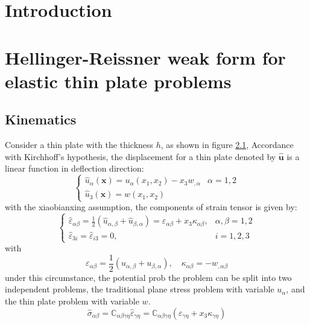 \documentclass{article}
\begin{document}
\section{Introduction}

\section{Hellinger-Reissner weak form for elastic thin plate problems}

\subsection{Kinematics}

Consider a thin plate with the thickness $h$, as shown in figure \ref{}, 
Accordance with Kirchhoff's hypothesis, the displacement for a thin plate denoted by $\hat {\boldsymbol u}$ is a linear function in deflection direction:
\begin{equation}
    \begin{cases}
        \hat u_{\alpha}(\boldsymbol x) = u_{\alpha}(x_1,x_2) - x_3 w_{,\alpha} & \alpha = 1,2 \\
        \hat u_{3}(\boldsymbol x) = w(x_1,x_2)
    \end{cases}
\end{equation}
with the xiaobianxing assumption, the components of strain tensor is given by:
\begin{equation}
    \begin{cases}
        \hat \varepsilon_{\alpha \beta} = \frac{1}{2}(\hat u_{\alpha,\beta} + \hat u_{\beta,\alpha}) = \varepsilon_{\alpha \beta} + x_3 \kappa_{\alpha \beta}, & \alpha,\beta = 1,2 \\
        \hat \varepsilon_{3i} = \hat \varepsilon_{i3} = 0, & i = 1,2,3
    \end{cases}
\end{equation}
with
\begin{equation}
    \varepsilon_{\alpha \beta} = \frac{1}{2}(u_{\alpha,\beta} + u_{\beta,\alpha}), \quad \kappa_{\alpha \beta} = -w_{,\alpha \beta}
\end{equation}
under this circumstance, the potential prob
the problem can be split into two independent problems, the traditional plane stress problem with variable $u_\alpha$, and the thin plate problem with variable $w$.
\begin{equation}
    \hat \sigma_{\alpha \beta} = \mathbb{C}_{\alpha \beta \gamma \eta} \hat \varepsilon_{\gamma \eta} = \mathbb{C}_{\alpha \beta \gamma \eta}(\varepsilon_{\gamma \eta} + x_3 \kappa_{\gamma \eta})
\end{equation}
\end{document}
